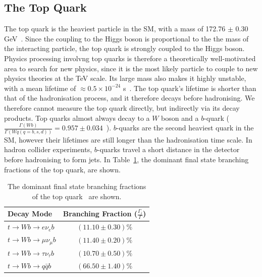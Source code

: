 \subsection{The Top Quark}
The top quark is the heaviest particle in the SM, with a mass of 172.76 $\pm$ 0.30 GeV~\cite{pdg}. Since the coupling to the Higgs boson is proportional to the the mass of the interacting particle, the top quark is strongly coupled to the Higgs boson. Physics processing involvng top quarks is therefore a theoretically well-motivated area to search for new physics, since it is the most likely particle to couple to new physics theories at the TeV scale. Its large mass also makes it highly unstable, with a mean lifetime of $\approx 0.5 \times 10^{-24}$ s~\cite{pdg}. The top quark's lifetime is shorter than that of the hadronisation process, and it therefore decays before hadronising. We therefore cannot measure the top quark directly, but indirectly via its decay products. Top quarks almost always decay to a $W$ boson and a $b$-quark ($\frac{\Gamma(Wb)}{\Gamma( Wq (q=b,s,d))} = 0.957\pm 0.034$~\cite{pdg}). $b$-quarks are the second heaviest quark in the SM, however their lifetimes are still longer than the hadronisation time scale. In hadron collider experiments, $b$-quarks travel a short distance in the detector before hadronising to form jets. In Table~\ref{tab:top-decay-modes}, the dominant final state branching fractions of the top quark, are shown.

\begin{table}[h!]
\def\arraystretch{1.5}%
\begin{tabular}{l|c}
\hline
Decay Mode & Branching Fraction ($\frac{\Gamma_{i}}{\Gamma}$)\\ \hline
$t \rightarrow Wb \rightarrow e\nu_{e} b$           &      $(11.10\pm 0.30)\%$     \\
$t \rightarrow Wb \rightarrow \mu \nu_{\mu} b$             &   $(11.40\pm 0.20)\%$        \\
       $t \rightarrow Wb \rightarrow \tau \nu_{\tau} b$      &  $(10.70\pm 0.50)\%$         \\
  $t \rightarrow Wb\rightarrow q\bar{q} b$           &      $(66.50\pm 1.40)\%$     \\ \hline
\end{tabular}
\centering
\caption{The dominant final state branching fractions of the top quark~\cite{pdg} are shown.}
\label{tab:top-decay-modes}
\end{table}


